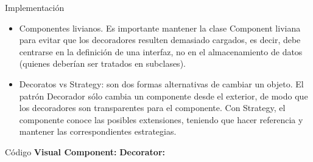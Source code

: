 \documentclass{beamer}
\begin{document}
\begin{frame}{Implementación}
 \begin{itemize}
  \item Componentes livianos. Es importante mantener la clase Component liviana para evitar que los decoradores resulten demasiado cargados, es decir, debe centrarse en la definición de una interfaz, no en el almacenamiento de datos (quienes deberían ser tratados en subclases).
  \item Decoratos vs Strategy: son dos formas alternativas de cambiar un objeto. El patrón Decorador sólo cambia un componente desde el exterior, de modo que los decoradores son transparentes para el componente. Con Strategy, el componente conoce las posibles extensiones, teniendo que hacer referencia y mantener las correspondientes estrategias.
 \end{itemize}
\end{frame}




\begin{frame}{Código}
\textbf{Visual Component:}
 \lstVC
\textbf{Decorator:}
 \lstD
\end{frame}


\end{document}
